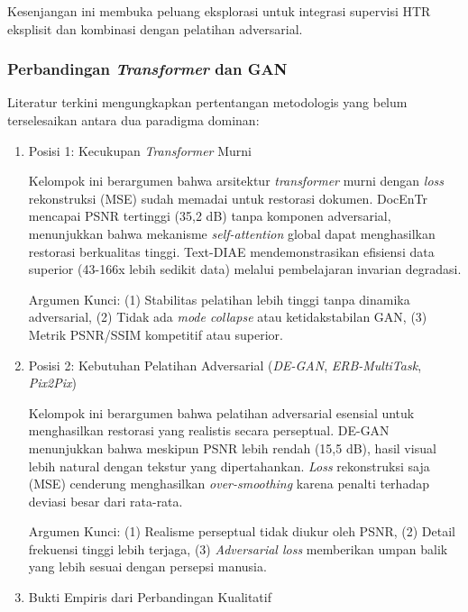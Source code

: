 Kesenjangan ini membuka peluang eksplorasi untuk integrasi supervisi HTR eksplisit dan kombinasi dengan pelatihan adversarial.

\subsubsection{Perbandingan \textit{Transformer} dan GAN}
\label{subsubsec:methodological-debate}
Literatur terkini mengungkapkan pertentangan metodologis yang belum terselesaikan antara dua paradigma dominan:

\begin{enumerate}[leftmargin=*, labelindent=0pt, itemsep=1ex, topsep=0pt]

\item Posisi 1: Kecukupan \textit{Transformer} Murni
\label{para:debat-posisi1}

Kelompok ini berargumen bahwa arsitektur \textit{transformer} murni dengan \textit{loss} rekonstruksi (MSE) sudah memadai untuk restorasi dokumen. DocEnTr mencapai PSNR tertinggi (35,2 dB) tanpa komponen adversarial, menunjukkan bahwa mekanisme \textit{self-attention} global dapat menghasilkan restorasi berkualitas tinggi. Text-DIAE mendemonstrasikan efisiensi data superior (43-166x lebih sedikit data) melalui pembelajaran invarian degradasi.

Argumen Kunci: (1) Stabilitas pelatihan lebih tinggi tanpa dinamika adversarial, (2) Tidak ada \textit{mode collapse} atau ketidakstabilan GAN, (3) Metrik PSNR/SSIM kompetitif atau superior.

\item Posisi 2: Kebutuhan Pelatihan Adversarial (\textit{DE-GAN}, \textit{ERB-MultiTask}, \textit{Pix2Pix})

Kelompok ini berargumen bahwa pelatihan adversarial esensial untuk menghasilkan restorasi yang realistis secara perseptual. DE-GAN menunjukkan bahwa meskipun PSNR lebih rendah (15,5 dB), hasil visual lebih natural dengan tekstur yang dipertahankan. \textit{Loss} rekonstruksi saja (MSE) cenderung menghasilkan \textit{over-smoothing} karena penalti terhadap deviasi besar dari rata-rata.

Argumen Kunci: (1) Realisme perseptual tidak diukur oleh PSNR, (2) Detail frekuensi tinggi lebih terjaga, (3) \textit{Adversarial loss} memberikan umpan balik yang lebih sesuai dengan persepsi manusia.

\item Bukti Empiris dari Perbandingan Kualitatif


\end{enumerate}
